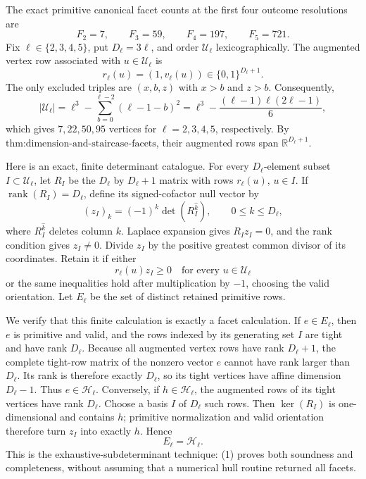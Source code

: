 The exact primitive canonical facet counts at the first four outcome resolutions are
\[
F_2=7,\qquad F_3=59,\qquad F_4=197,\qquad F_5=721.
\]
Fix \(\ell\in\{2,3,4,5\}\), put \(D_\ell=3\ell\), and order \(\mathcal U_\ell\) lexicographically.  The augmented vertex row associated with \(u\in\mathcal U_\ell\) is
\[
r_\ell(u)=(1,v_\ell(u))\in\{0,1\}^{D_\ell+1}.
\]
The only excluded triples are \((x,b,z)\) with \(x>b\) and \(z>b\).  Consequently,
\[
|\mathcal U_\ell|
=\ell^3-\sum_{b=0}^{\ell-2}(\ell-1-b)^2
=\ell^3-\frac{(\ell-1)\ell(2\ell-1)}6,
\]
which gives \(7,22,50,95\) vertices for \(\ell=2,3,4,5\), respectively.  By \(\text{thm:dimension-and-staircase-facets}\), their augmented rows span \(\mathbb R^{D_\ell+1}\).

Here is an exact, finite determinant catalogue.  For every \(D_\ell\)-element subset \(I\subset\mathcal U_\ell\), let \(R_I\) be the \(D_\ell\) by \(D_\ell+1\) matrix with rows \(r_\ell(u)\), \(u\in I\).  If \(\operatorname{rank}(R_I)=D_\ell\), define its signed-cofactor null vector by
\[
(z_I)_k=(-1)^k\det(R_I^{\widehat k}),\qquad 0\le k\le D_\ell,
\]
where \(R_I^{\widehat k}\) deletes column \(k\).  Laplace expansion gives \(R_Iz_I=0\), and the rank condition gives \(z_I\ne0\).  Divide \(z_I\) by the positive greatest common divisor of its coordinates.  Retain it if either
\[
r_\ell(u)z_I\ge0\quad\text{for every }u\in\mathcal U_\ell
\]
or the same inequalities hold after multiplication by \(-1\), choosing the valid orientation.  Let \(E_\ell\) be the set of distinct retained primitive rows.

We verify that this finite calculation is exactly a facet calculation.  If \(e\in E_\ell\), then \(e\) is primitive and valid, and the rows indexed by its generating set \(I\) are tight and have rank \(D_\ell\).  Because all augmented vertex rows have rank \(D_\ell+1\), the complete tight-row matrix of the nonzero vector \(e\) cannot have rank larger than \(D_\ell\).  Its rank is therefore exactly \(D_\ell\), so its tight vertices have affine dimension \(D_\ell-1\).  Thus \(e\in\mathcal H_\ell\).  Conversely, if \(h\in\mathcal H_\ell\), the augmented rows of its tight vertices have rank \(D_\ell\).  Choose a basis \(I\) of \(D_\ell\) such rows.  Then \(\ker(R_I)\) is one-dimensional and contains \(h\); primitive normalization and valid orientation therefore turn \(z_I\) into exactly \(h\).  Hence
\[
E_\ell=\mathcal H_\ell. \tag{1}
\]
This is the exhaustive-subdeterminant technique: (1) proves both soundness and completeness, without assuming that a numerical hull routine returned all facets.

